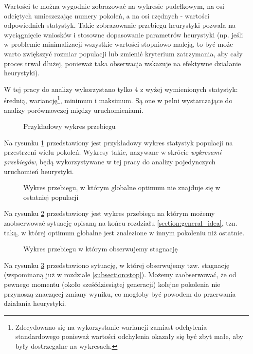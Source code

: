 \documentclass[twoside]{iisthesis}
\newcommand{\graph}[1]{\centering }
\begin{document}
Wartości te można wygodnie zobrazować na wykresie pudełkowym, na osi odciętych umieszczając numery pokoleń, a na osi rzędnych - wartości odpowiednich statystyk. Takie zobrazowanie przebiegu heurystyki pozwala na wyciągnięcie wniosków i stosowne dopasowanie parametrów heurystyki (np. jeśli w problemie minimalizacji wszystkie wartości stopniowo maleją, to być może warto zwiększyć rozmiar populacji lub zmienić kryterium zatrzymania, aby cały proces trwał dłużej, ponieważ taka obserwacja wskazuje na efektywne działanie heurystyki).

W tej pracy do analizy wykorzystano tylko 4 z wyżej wymienionych statystyk: średnią, wariancję\footnote{Zdecydowano się na wykorzystanie wariancji zamiast odchylenia standardowego ponieważ wartości odchylenia okazały się być zbyt małe, aby były dostrzegalne na wykresach.}, minimum i maksimum. Są one w pełni wystarczające do analizy porównawczej między uruchomieniami. 


\begin{figure}[H]
	\caption{Przykładowy wykres przebiegu \label{plot:random_example}}
	\centering
	\graph{random_example.tex}
\end{figure}

Na rysunku \ref{plot:random_example} przedstawiony jest przykładowy wykres statystyk populacji na przestrzeni wielu pokoleń. Wykresy takie, nazywane w skrócie \emph{wykresami przebiegów}, będą wykorzystywane w tej pracy do analizy pojedynczych uruchomień heurystyki. 

\begin{figure}[H]
	\caption{Wykres przebiegu, w którym globalne optimum nie znajduje się w ostatniej populacji \label{plot:mid_opt}}
	\centering
	\graph{mid_optimum.tex}
\end{figure}

Na rysunku \ref{plot:mid_opt} przedstawiony jest wykres przebiegu na którym możemy zaobserwować sytuację opisaną na końcu rozdziału \ref{section:general_idea}, tzn. taką, w której optimum globalne jest znalezione w innym pokoleniu niż ostatnie.

\begin{figure}[H]
	\caption{Wykres przebiegu w którym obserwujemy stagnację \label{plot:stagnation}}
	\centering
	\graph{stagnation.tex}
\end{figure}

Na rysunku \ref{plot:stagnation} przedstawiono sytuację, w której obserwujemy tzw. stagnację (wspominaną już w rozdziale \ref{subsection:stop}). Możemy zaobserwować, że od pewnego momentu (około sześćdziesiątej generacji) kolejne pokolenia nie przynoszą znaczącej zmiany wyniku, co mogłoby być powodem do przerwania działania heurystyki.
\end{document}
